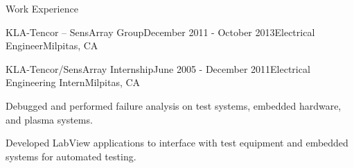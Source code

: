 \documentclass{resume} %
\begin{document}
\begin{rSection}{Work Experience}
\begin{rSubsection2}{KLA-Tencor -- SensArray Group}{December 2011 - October 2013}{Electrical Engineer}{Milpitas, CA}

\end{rSubsection2}

\pagebreak[2]
\begin{rSubsection}{KLA-Tencor/SensArray Internship}{June 2005 - December 2011}{Electrical Engineering Intern}{Milpitas, CA}
\item Debugged and performed failure analysis on test systems, embedded hardware, and plasma systems.
\item Developed LabView applications to interface with test equipment and embedded systems for automated testing.
\end{rSubsection}
\end{rSection}
\end{document}
